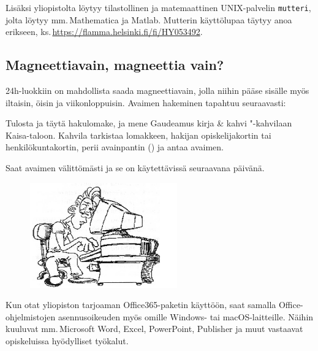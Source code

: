 \documentclass[a5paper, 8pt, twocolumn]{book} %
\numberwithin{equation}{section}
\begin{document}
Lisäksi yli\-opistolta löytyy tilastollinen ja matemaattinen UNIX-palvelin \texttt{mutteri}, jolta löytyy
mm.\,Mathematica ja Matlab. Mutterin käyttö\-lupaa täytyy anoa erikseen, ks.\,\url{https://flamma.helsinki.fi/fi/HY053492}.

\subsection*{Magneettiavain, magneettia vain?}
24h-luokkiin on mahdollista saada magneettiavain,
jolla niihin pääse sisälle myös
iltaisin, öisin ja viikonloppuisin. Avaimen
hakeminen tapahtuu seuraavasti:

Tulosta ja täytä hakulomake, ja mene Gaudeamus kirja \& kahvi "-kahvilaan Kaisa-taloon. Kahvila tarkistaa lomakkeen, hakijan opiskelijakortin tai henkilökuntakortin, perii avainpantin () ja antaa avaimen.

Saat avaimen välittömästi ja se on käytettävissä
seuraavana päivänä.

\begin{figure}[!b]
	\centering
	\includegraphics[width=\columnwidth]{ruuduntuijotus.png}
\end{figure}

Kun otat yliopiston tarjoaman Office365-paketin käyttöön, saat samalla Office-ohjelmistojen asennus\-oikeuden myös omille Windows- tai macOS-laitteille. Näihin kuuluvat mm.\,Microsoft Word, Excel, PowerPoint, Publisher ja muut vastaavat opiskeluissa hyödylliset työkalut.
\end{document}
